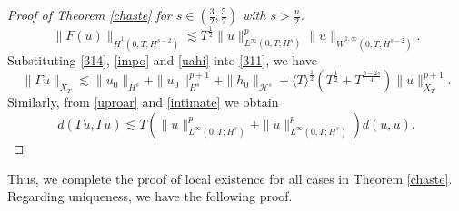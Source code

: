 \documentclass[preprint,compress,12pt]{elsarticle}
\numberwithin{equation}{section}
\begin{document}
\begin{proof}[Proof of Theorem \ref{chaste} for $s\in\left(\frac{3}{2},\frac{5}{2}\right)$ with $s>\frac{n}{2}$]
	\begin{equation}\label{uahi}
		\|F(u)\|_{\dot{H}^{1}(0,T;H^{s-2})}\lesssim T^{\frac{1}{2}} \|u\|_{L^{\infty}(0,T;H^{s})}^{p}\|u\|_{\dot{W}^{1,\infty}(0,T;H^{s-2})}.
	\end{equation}
	Substituting \eqref{314}, \eqref{impo} and \eqref{uahi} into \eqref{311}, we have
	\begin{equation}\label{319}
		\|\Gamma u\|_{X_{T}}\lesssim \|u_{0}\|_{H^{s}}+\|u_{0}\|_{H^{s}}^{p+1}+\|h_{0}\|_{\mathcal{H}^{s}} +\langle T\rangle^{\frac{1}{2}} (T^{\frac{1}{2}}+T^{\frac{5-2s}{4}})\|u\|_{X_{T}}^{p+1}.
	\end{equation}
	Similarly, from \eqref{uproar} and  \eqref{intimate} we obtain
	\begin{equation}
		d(\Gamma u,\Gamma \tilde{u})\lesssim T \left(\|u\|_{L^{\infty}(0,T;H^{s})}^{p}+\|\tilde{u}\|_{L^{\infty}(0,T;H^{s})}^{p}\right) d(u,\tilde{u}).
	\end{equation}
\end{proof}	
Thus, we complete the proof of local existence for all cases in Theorem \ref{chaste}. Regarding uniqueness, we have the following proof.
\end{document}
